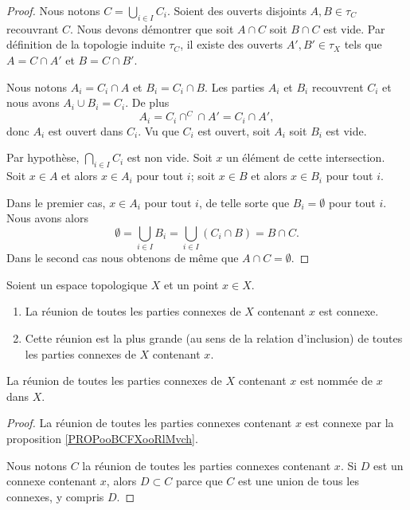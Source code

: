 \begin{proof}
	Nous notons \( C=\bigcup_{i\in I}C_i\). Soient des ouverts disjoints \( A,B\in \tau_C\) recouvrant \( C\). Nous devons démontrer que soit \( A\cap C\) soit \( B\cap C\) est vide. Par définition de la topologie induite \( \tau_C\), il existe des ouverts \( A',B'\in\tau_X\) tels que \( A=C\cap A'\) et \( B=C\cap B'\).

	Nous notons \( A_i=C_i\cap A\) et \( B_i=C_i\cap B\). Les parties \( A_i\) et \( B_i\) recouvrent \( C_i\) et nous avons \( A_i\cup B_i=C_i\). De plus
	\begin{equation}
		A_i=C_i\cap^C\cap A'=C_i\cap A',
	\end{equation}
	donc \( A_i\) est ouvert dans \( C_i\). Vu que \( C_i\) est ouvert, soit \( A_i\) soit \( B_i\) est vide.

	Par hypothèse, \( \bigcap_{i\in I}C_i\) est non vide. Soit \( x\) un élément de cette intersection. Soit \( x\in A\) et alors \( x\in A_i\) pour tout \( i\); soit \( x\in B\) et alors \( x\in B_i\) pour tout \( i\).

	Dans le premier cas, \( x\in A_i\) pour tout \( i\), de telle sorte que \( B_i=\emptyset\) pour tout \( i\). Nous avons alors
	\begin{equation}
		\emptyset=\bigcup_{i\in I}B_i=\bigcup_{i\in I}(C_i\cap B)=B\cap C.
	\end{equation}
	Dans le second cas nous obtenons de même que \( A\cap C=\emptyset\).
\end{proof}


\begin{propositionDef}        \label{DEFooFHXNooJGUPPn}
	Soient un espace topologique \( X\) et un point \( x\in X\).
	\begin{enumerate}
		\item		\label{ITEMooBZAQooNwuzaS}
		      La réunion de toutes les parties connexes de \( X\) contenant \( x\) est connexe.
		\item
		      Cette réunion est la plus grande (au sens de la relation d'inclusion) de toutes les parties connexes de \( X\) contenant \( x\).
	\end{enumerate}
	La réunion de toutes les parties connexes de \( X\) contenant \( x\) est nommée  de \( x\) dans \( X\).
\end{propositionDef}

\begin{proof}
	La réunion de toutes les parties connexes contenant \( x\) est connexe par la proposition \ref{PROPooBCFXooRlMvch}.

	Nous notons \( C\) la réunion de toutes les parties connexes contenant \( x\). Si \( D\) est un connexe contenant \( x\), alors \( D\subset C\) parce que \( C\) est une union de tous les connexes, y compris \( D\).
\end{proof}

